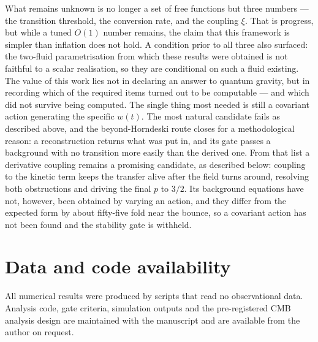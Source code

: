 \documentclass[a4paper,11pt]{article}
\begin{document}
What remains unknown is no longer a set of free functions but three numbers --- the transition threshold, the conversion rate, and the coupling $\xi$. That is progress, but while a tuned $O(1)$ number remains, the claim that this framework is simpler than inflation does not hold. A condition prior to all three also surfaced: the two-fluid parametrisation from which these results were obtained is not faithful to a scalar realisation, so they are conditional on such a fluid existing. The value of this work lies not in declaring an answer to quantum gravity, but in recording which of the required items turned out to be computable --- and which did not survive being computed. The single thing most needed is still a covariant action generating the specific $w(t)$. The most natural candidate fails as described above, and the beyond-Horndeski route closes for a methodological reason: a reconstruction returns what was put in, and its gate passes a background with no transition more easily than the derived one. From that list a derivative coupling remains a promising candidate, as described below: coupling to the kinetic term keeps the transfer alive after the field turns around, resolving both obstructions and driving the final $p$ to $3/2$. Its background equations have not, however, been obtained by varying an action, and they differ from the expected form by about fifty-five fold near the bounce, so a covariant action has not been found and the stability gate is withheld.

\section*{Data and code availability}

All numerical results were produced by scripts that read no observational data. Analysis code, gate criteria, simulation outputs and the pre-registered CMB analysis design are maintained with the manuscript and are available from the author on request.
\end{document}
